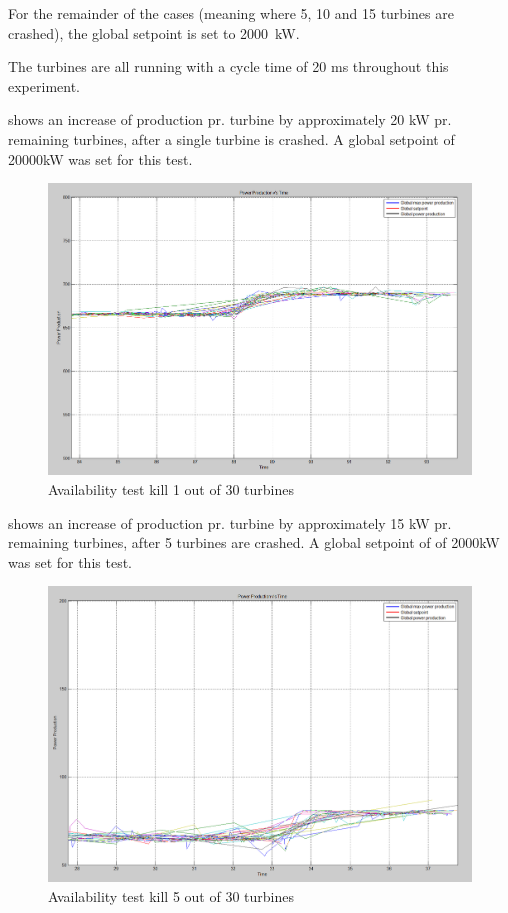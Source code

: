 For the remainder of the cases (meaning where 5, 10 and 15 turbines are crashed), the global setpoint is set to 2000~kW.

The turbines are all running with a cycle time of 20 ms throughout this experiment.

 shows an increase of production pr. turbine by approximately 20 kW pr. remaining turbines, after a single turbine is crashed. A global setpoint of 20000kW was set for this test.

\begin{figure} [!h]
	\centering
	\includegraphics[width=\resultsFigureWidthScale\textwidth]{figures/Results/availabilitytest30-29_setpoint_20000.PNG}
	\caption{Availability test kill 1 out of 30 turbines}
	\label{fig:exp:availability_kill1}
\end{figure}

 shows an increase of production pr. turbine by approximately 15 kW pr. remaining turbines, after 5 turbines are crashed. A global setpoint of of 2000kW was set for this test.

\begin{figure} [!h]
	\centering
	\includegraphics[width=\resultsFigureWidthScale\textwidth]{figures/Results/availabilitytest30-25_setpoint_2000.PNG}
	\caption{Availability test kill 5 out of 30 turbines}
	\label{fig:exp:availability_kill5}
\end{figure}

